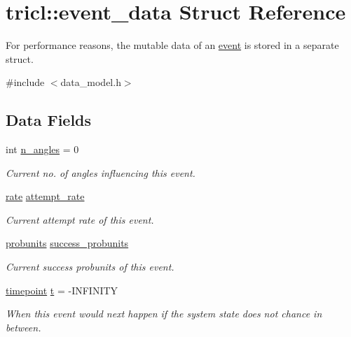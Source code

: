 \hypertarget{structtricl_1_1event__data}{}\section{tricl\+:\+:event\+\_\+data Struct Reference}
\label{structtricl_1_1event__data}


For performance reasons, the mutable data of an \hyperlink{structtricl_1_1event}{event} is stored in a separate struct.  




{\ttfamily \#include $<$data\+\_\+model.\+h$>$}

\subsection*{Data Fields}
\begin{DoxyCompactItemize}
\item 
\mbox{\label{structtricl_1_1event__data_a6c10029d49048e80c295b346a5b987f9}} 
int \hyperlink{structtricl_1_1event__data_a6c10029d49048e80c295b346a5b987f9}{n\+\_\+angles} = 0
\begin{DoxyCompactList}\small\item\em Current no. of angles influencing this event. \end{DoxyCompactList}\item 
\mbox{\label{structtricl_1_1event__data_ab1a97598f3ac7947b16c785138d754df}} 
\hyperlink{namespacetricl_ae42d2696f294300a43e0f5edf4875479}{rate} \hyperlink{structtricl_1_1event__data_ab1a97598f3ac7947b16c785138d754df}{attempt\+\_\+rate}
\begin{DoxyCompactList}\small\item\em Current attempt rate of this event. \end{DoxyCompactList}\item 
\mbox{\label{structtricl_1_1event__data_af2cce9d4c534778696f87867c156d076}} 
\hyperlink{namespacetricl_af8f8f9076e92e1c664ffa96f18d038a5}{probunits} \hyperlink{structtricl_1_1event__data_af2cce9d4c534778696f87867c156d076}{success\+\_\+probunits}
\begin{DoxyCompactList}\small\item\em Current success probunits of this event. \end{DoxyCompactList}\item 
\mbox{\label{structtricl_1_1event__data_acd1cbe2baf952a87e40d96d5ff60ccb6}} 
\hyperlink{namespacetricl_a720ff6a29f998e11e1d3622fc8df64b1}{timepoint} \hyperlink{structtricl_1_1event__data_acd1cbe2baf952a87e40d96d5ff60ccb6}{t} = -\/I\+N\+F\+I\+N\+I\+TY
\begin{DoxyCompactList}\small\item\em When this event would next happen if the system state does not chance in between. \end{DoxyCompactList}\end{DoxyCompactItemize}


